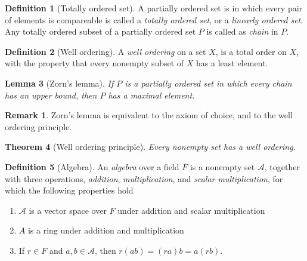 \documentclass[12pt]{article}
\newtheorem{theorem}{Theorem}[section]
\newtheorem{lemma}[theorem]{Lemma}
\theoremstyle{definition}
\newtheorem{definition}[theorem]{Definition}
\newtheorem*{remark}{Remark}
\begin{document}
\begin{definition}[Totally ordered set]
    A partially ordered set is in which every pair of elements is compareable is called a \textit{totally ordered set}, or a \textit{linearly ordered set}. Any totally ordered subset of a partially ordered set $P$ is called as \textit{chain} in $P$.
\end{definition}
\begin{definition}[Well ordering]
    A \textit{well ordering} on a set $X$, is a total order on $X$, with the property that every nonempty subset of $X$ has a least element.
\end{definition}
\begin{lemma}[Zorn's lemma]
    If $P$ is a partially ordered set in which every chain has an upper bound, then $P$ has a maximal element.
\end{lemma}
\begin{remark}
    Zorn's lemma is equivalent to the axiom of choice, and to the well ordering principle.
\end{remark}
\begin{theorem}[Well ordering principle]
    Every nonempty set has a well ordering.
\end{theorem}
\begin{definition}[Algebra]
    An \textit{algebra} over a field $F$ is a nonempty set $\mathcal{A}$, together with three operations, \textit{addition}, \textit{multiplication}, and \textit{scalar multiplication}, for which the following properties hold
    \begin{enumerate}
        \item $\mathcal{A}$ is a vector space over $F$ under addition and scalar multiplication
        \item $A$ is a ring under addition and multiplication
        \item If $r\in F$ and $a,b\in \mathcal{A}$, then $r(ab)=(ra)b=a(rb)$.
    \end{enumerate}
\end{definition}

\newpage
\end{document}
